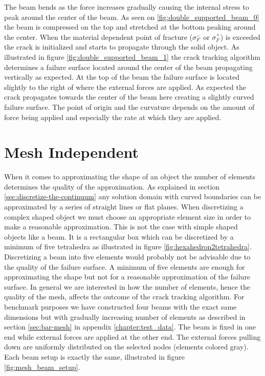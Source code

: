 The beam bends as the force increases gradually causing the internal
stress to peak around the center of the beam. As seen on
\vref{fig:double_supported_beam_0} the beam is compressed on the top
and stretched at the bottom peaking around the center.
When the material dependent point of fracture ($\sigma^-_F$ or $\sigma^+_F$) is exceeded the crack is
initialized and starts to propagate through the solid object. As
illustrated in figure \vref{fig:double_supported_beam_1} the crack
tracking algorithm determines a failure surface located around the
center of the beam propagating vertically as expected. At the top of
the beam the failure surface is located slightly to the right of where
the external forces are applied. As expected the crack propagates
towards the center of the beam here creating a slightly curved
failure surface. The point of origin and the
curvature depends on the amount of force being applied and especially
the rate at which they are applied. 


\section{Mesh Independent}
When it comes to approximating the shape of an object the number of
elements determines the quality of the approximation. As explained in
section \vref{sec:discretize-the-continuum} any solution domain with curved
boundaries can be approximated by a series of straight lines or flat
planes. When discretizing a complex shaped object we must
choose an appropriate element size in order to make a reasonable
approximation. This is not the case with simple
shaped objects like a beam. It is a rectangular box which can be
discretized by a minimum of five tetrahedra as illustrated in figure
\vref{fig:hexahedron2tetrahedra}.
%
Discretizing a beam into five elements would probably not be advisable
due to the quality of the failure surface.
A minimum of five
elements are enough for approximating the shape but not for a
reasonable approximation of the failure surface. In general we are
interested in how the number of elements, hence the quality of the
mesh, affects the outcome of the crack tracking algorithm. 
For benchmark purposes we have constructed four beams with the exact
same dimensions but with gradually increasing number of elements as
described in section \vref{sec:bar-mesh} in appendix \ref{chapter:test_data}.
The beam is fixed in one end while external forces are
applied at the other end. The external forces pulling down are 
uniformly distributed on the selected nodes (elements colored
gray). Each beam 
setup is exactly the same, illustrated in figure
\vref{fig:mesh_beam_setup}.

